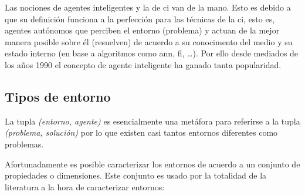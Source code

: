 Las nociones de agentes inteligentes y la de \gls{ci} van de la mano. Esto es debido a que su definición funciona a la perfección para las técnicas de la \gls{ci}, esto es, agentes autónomos que perciben el entorno (problema) y actuan de la mejor manera posible sobre él (resuelven) de acuerdo a su conocimento del medio y su estado interno (en base a algoritmos como \gls{ann}, \gls{fl}, \ldots). Por ello desde mediados de los años 1990 el concepto de agente inteligente ha ganado tanta popularidad.

\subsection{Tipos de entorno}

La tupla \textit{(entorno, agente)} es esencialmente una metáfora para referirse a la tupla \textit{(problema, solución)} por lo que existen casi tantos entornos diferentes como problemas.

Afortunadamente es posible caracterizar los entornos de acuerdo a un conjunto de propiedades o dimensiones. Este conjunto es usado por la totalidad de la literatura a la hora de caracterizar entornos:

